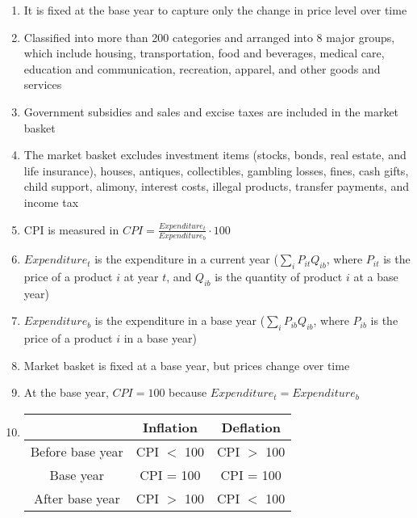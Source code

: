 \documentclass[12pt]{article}
\begin{document}
\begin{enumerate}
\begin{enumerate}
\begin{enumerate}
\begin{enumerate}
                  \item It is fixed at the base year to capture only the change in price level over time

                  \item Classified into more than 200 categories and arranged into 8 major groups, which include housing, transportation, food and beverages, medical care, education and communication, recreation, apparel, and other goods and services

                  \item Government subsidies and sales and excise taxes are included in the market basket

                  \item The market basket excludes investment items (stocks, bonds, real estate, and life insurance), houses, antiques, collectibles, gambling losses, fines, cash gifts, child support, alimony, interest costs, illegal products, transfer payments, and income tax

                  \item CPI is measured in $CPI=\frac{Expenditure_t}{Expenditure_b}\cdot100$

                  \item $Expenditure_t$ is the expenditure in a current year ($\sum_i P_{it}Q_{ib}$, where $P_{it}$ is the price of a product $i$ at year $t$, and $Q_{ib}$ is the quantity of product $i$ at a base year)

                    \item $Expenditure_b$ is the expenditure in a base year ($\sum_i P_{ib}Q_{ib}$, where $P_{ib}$ is the price of a product $i$ in a base year)

                    \item Market basket is fixed at a base year, but prices change over time

                    \item At the base year, $CPI=100$ because $Expenditure_t=Expenditure_b$

                  \item \begin{tabular}{|c|c|c|} \hline & Inflation & Deflation\\ \hline Before base year & CPI $<$ 100 & CPI $>$ 100\\ \hline Base year & CPI = 100 & CPI = 100\\ \hline After base year & CPI $>$ 100 & CPI $<$ 100\\\hline  \end{tabular}


\end{enumerate}
\end{enumerate}
\end{enumerate}
\end{enumerate}
\end{document}

